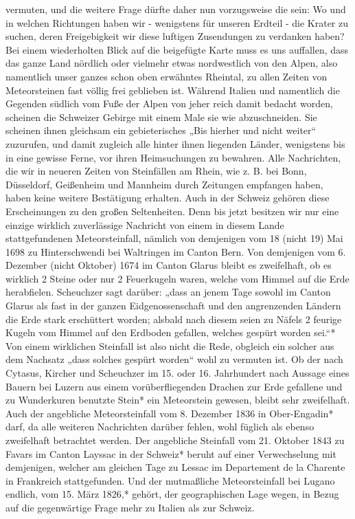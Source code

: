 \documentclass[a4paper, 11pt, oneside, polutonikogreek, german]{article}
\begin{document}
vermuten, und die weitere Frage dürfte daher nun vorzugsweise die sein: Wo und in welchen Richtungen haben wir - wenigstens für unseren Erdteil - die Krater zu suchen, deren Freigebigkeit wir diese luftigen Zusendungen zu verdanken haben? Bei einem wiederholten Blick auf die beigefügte Karte muss es uns auffallen, dass das ganze Land nördlich oder vielmehr etwas nordwestlich von den Alpen, also namentlich unser ganzes schon oben erwähntes Rheintal, zu allen Zeiten von Meteorsteinen fast völlig frei geblieben ist. Während Italien und namentlich die Gegenden südlich vom Fuße der Alpen von jeher reich damit bedacht worden, scheinen die Schweizer Gebirge mit einem Male sie wie abzuschneiden. Sie scheinen ihnen gleichsam ein gebieterisches „Bis hierher und nicht weiter“ zuzurufen, und damit zugleich alle hinter ihnen liegenden Länder, wenigstens bis in eine gewisse Ferne, vor ihren Heimsuchungen zu bewahren. Alle Nachrichten, die wir in neueren Zeiten von Steinfällen am Rhein, wie z. B. bei Bonn, Düsseldorf, Geißenheim und Mannheim durch Zeitungen empfangen haben, haben keine weitere Bestätigung erhalten. Auch in der Schweiz gehören diese Erscheinungen zu den großen Seltenheiten. Denn bis jetzt besitzen wir nur eine einzige wirklich zuverlässige Nachricht von einem in diesem Lande stattgefundenen Meteorsteinfall, nämlich von demjenigen vom 18 (nicht 19) Mai 1698 zu Hinterschwendi bei Waltringen im Canton Bern. Von demjenigen vom 6. Dezember (nicht Oktober) 1674 im Canton Glarus bleibt es zweifelhaft, ob es wirklich 2 Steine oder nur 2 Feuerkugeln waren, welche vom Himmel auf die Erde herabfielen. Scheuchzer sagt darüber: „dass an jenem Tage sowohl im Canton Glarus als fast in der ganzen Eidgenossenschaft und den angrenzenden Ländern die Erde stark erschüttert worden; alsbald nach diesem seien zu Näfels 2 feurige Kugeln vom Himmel auf den Erdboden gefallen, welches gespürt worden sei.“* Von einem wirklichen Steinfall ist also nicht die Rede, obgleich ein solcher aus dem Nachsatz „dass solches gespürt worden“ wohl zu vermuten ist. Ob der nach Cytasus, Kircher und Scheuchzer im 15. oder 16. Jahrhundert nach Aussage eines Bauern bei Luzern aus einem vorüberfliegenden Drachen zur Erde gefallene und zu Wunderkuren benutzte Stein* ein Meteorstein gewesen, bleibt sehr zweifelhaft. Auch der angebliche Meteorsteinfall vom 8. Dezember 1836 in Ober-Engadin* darf, da alle weiteren Nachrichten darüber fehlen, wohl füglich als ebenso zweifelhaft betrachtet werden. Der angebliche Steinfall vom 21. Oktober 1843 zu Favars im Canton Layssac in der Schweiz* beruht auf einer Verwechselung mit demjenigen, welcher am gleichen Tage zu Lessac im Departement de la Charente in Frankreich stattgefunden. Und der mutmaßliche Meteorsteinfall bei Lugano endlich, vom 15. März 1826,* gehört, der geographischen Lage wegen, in Bezug auf die gegenwärtige Frage mehr zu Italien als zur Schweiz.
\end{document}
